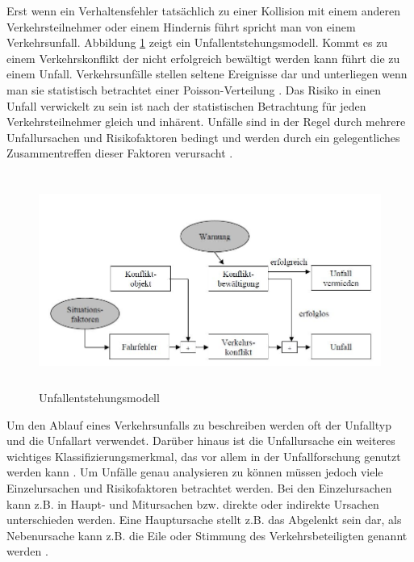 Erst wenn ein Verhaltensfehler tatsächlich zu einer Kollision mit einem anderen Verkehrsteilnehmer oder einem Hindernis führt spricht man von einem Verkehrsunfall. Abbildung \ref{fig:Unfallentstehung} zeigt ein Unfallentstehungsmodell. Kommt es zu einem Verkehrskonflikt der nicht erfolgreich bewältigt werden kann führt die zu einem Unfall. Verkehrsunfälle stellen seltene Ereignisse dar und unterliegen wenn man sie statistisch betrachtet einer Poisson-Verteilung \parencite[S. 18]{Grundl.2005}. Das Risiko in einen Unfall verwickelt zu sein ist nach der statistischen Betrachtung für jeden Verkehrsteilnehmer gleich und inhärent. Unfälle sind in der Regel durch mehrere Unfallursachen und Risikofaktoren bedingt und werden durch ein gelegentliches Zusammentreffen dieser Faktoren verursacht \parencite[S. 20]{Grundl.2005}.

\begin{savenotes}
	\begin{figure}[H]
		\centering
		\includegraphics[width=14cm,height=7cm]{figures/Unfallentstehung}
		\caption[Unfallentstehungsmodell]{Unfallentstehungsmodell \parencite[S. 44]{Fricke.2006}}\label{fig:Unfallentstehung}
	\end{figure}
\end{savenotes}

Um den Ablauf eines Verkehrsunfalls zu beschreiben werden oft der Unfalltyp und die Unfallart verwendet. Darüber hinaus ist die Unfallursache ein weiteres wichtiges Klassifizierungsmerkmal, das vor allem in der Unfallforschung genutzt werden kann \parencite[S. 16]{Gschwendtner.2015}. Um Unfälle genau analysieren zu können müssen jedoch viele Einzelursachen und Risikofaktoren betrachtet werden. Bei den Einzelursachen kann z.B. in Haupt- und Mitursachen bzw. direkte oder indirekte Ursachen unterschieden werden. Eine Hauptursache stellt z.B. das Abgelenkt sein dar, als Nebenursache kann z.B. die Eile oder Stimmung des Verkehrsbeteiligten genannt werden \parencite[S. 65-72]{Grundl.2005}. 

